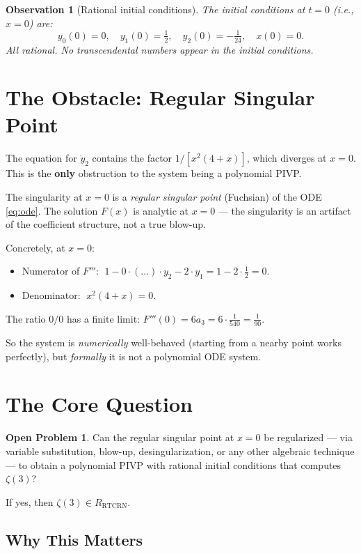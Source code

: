 \documentclass[11pt]{article}
\newtheorem{observation}{Observation}
\theoremstyle{definition}
\newtheorem{problem}{Open Problem}
\begin{document}
\begin{observation}[Rational initial conditions]
The initial conditions at $t=0$ (i.e., $x=0$) are:
\[
  y_0(0) = 0, \quad y_1(0) = \tfrac{1}{2}, \quad y_2(0) = -\tfrac{1}{24}, \quad x(0) = 0.
\]
All rational. No transcendental numbers appear in the initial conditions.
\end{observation}

\section{The Obstacle: Regular Singular Point}

The equation for $\dot{y}_2$ contains the factor $1/[x^2(4+x)]$, which diverges at $x=0$. This is the \textbf{only} obstruction to the system being a polynomial PIVP.

The singularity at $x=0$ is a \emph{regular singular point} (Fuchsian) of the ODE \eqref{eq:ode}. The solution $F(x)$ is analytic at $x=0$ --- the singularity is an artifact of the coefficient structure, not a true blow-up.

Concretely, at $x=0$:
\begin{itemize}
  \item Numerator of $F'''$: $\;1 - 0 \cdot (\ldots) \cdot y_2 - 2 \cdot y_1 = 1 - 2 \cdot \frac{1}{2} = 0$.
  \item Denominator: $\;x^2(4+x) = 0$.
\end{itemize}
The ratio $0/0$ has a finite limit: $F'''(0) = 6a_3 = 6 \cdot \frac{1}{540} = \frac{1}{90}$.

So the system is \emph{numerically} well-behaved (starting from a nearby point works perfectly), but \emph{formally} it is not a polynomial ODE system.

\section{The Core Question}

\begin{problem}
Can the regular singular point at $x=0$ be regularized --- via variable substitution, blow-up, desingularization, or any other algebraic technique --- to obtain a polynomial PIVP with rational initial conditions that computes $\zeta(3)$?
\end{problem}

If yes, then $\zeta(3) \in R_{\mathrm{RTCRN}}$.

\subsection{Why This Matters}
\end{document}
